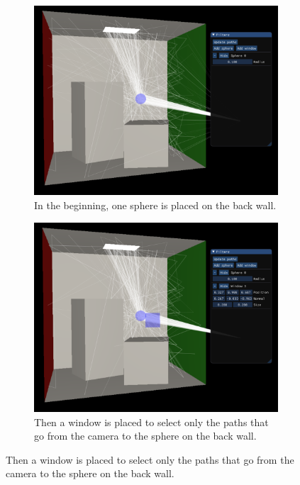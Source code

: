 \begin{figure}
	\centering
	\begin{subfigure}[t]{0.49\linewidth}
		\includegraphics[width=\textwidth]{chapters/chapter_thetool/filterscombination1.pdf}
		\caption{In the beginning, one sphere is placed on the back wall.}
	\end{subfigure}
	\begin{subfigure}[t]{0.49\linewidth}
		\includegraphics[width=\textwidth]{chapters/chapter_thetool/filterscombination2.pdf}
		\caption{Then a window is placed to select only the paths that go from the camera to the sphere on the back wall.}
	\end{subfigure}

\end{figure}
